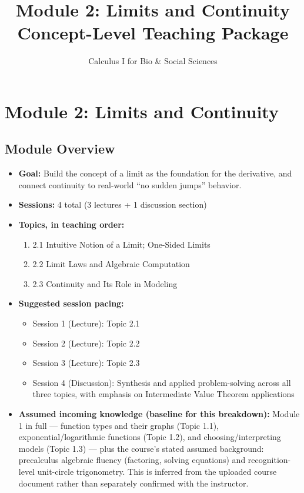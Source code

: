 \documentclass[11pt]{article}
\title{Module 2: Limits and Continuity \\ \large Concept-Level Teaching Package}
\author{Calculus I for Bio \& Social Sciences}
\date{}
\begin{document}
\maketitle
\tableofcontents

\section{Module 2: Limits and Continuity}

\subsection*{Module Overview}
\begin{itemize}[leftmargin=*]
  \item \textbf{Goal:} Build the concept of a limit as the foundation for the derivative, and connect continuity to real-world ``no sudden jumps'' behavior.
  \item \textbf{Sessions:} 4 total (3 lectures + 1 discussion section)
  \item \textbf{Topics, in teaching order:}
  \begin{enumerate}[leftmargin=*]
    \item 2.1 Intuitive Notion of a Limit; One-Sided Limits
    \item 2.2 Limit Laws and Algebraic Computation
    \item 2.3 Continuity and Its Role in Modeling
  \end{enumerate}
  \item \textbf{Suggested session pacing:}
  \begin{itemize}[leftmargin=*]
    \item Session 1 (Lecture): Topic 2.1
    \item Session 2 (Lecture): Topic 2.2
    \item Session 3 (Lecture): Topic 2.3
    \item Session 4 (Discussion): Synthesis and applied problem-solving across all three topics, with emphasis on Intermediate Value Theorem applications
  \end{itemize}
  \item \textbf{Assumed incoming knowledge (baseline for this breakdown):} Module 1 in full --- function types and their graphs (Topic 1.1), exponential/logarithmic functions (Topic 1.2), and choosing/interpreting models (Topic 1.3) --- plus the course's stated assumed background: precalculus algebraic fluency (factoring, solving equations) and recognition-level unit-circle trigonometry. This is inferred from the uploaded course document rather than separately confirmed with the instructor.
\end{itemize}
\end{document}
